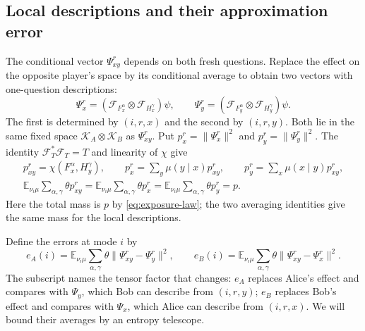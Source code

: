 \subsection{Local descriptions and their approximation error}

The conditional vector $\Psi_{xy}^r$ depends on both fresh questions.
Replace the effect on the opposite player's space by its conditional
average to obtain two vectors with one-question descriptions:
\[
 \Psi_x^r=(\mathcal F_{F_x^\alpha}\otimes
                         \mathcal F_{H_x^\gamma})\psi,\qquad
 \Psi_y^r=(\mathcal F_{F_y^\alpha}\otimes
                         \mathcal F_{H_y^\gamma})\psi.
\]
The first is determined by $(i,r,x)$ and the second by $(i,r,y)$.
Both lie in the same fixed space $\mathcal K_A\otimes\mathcal K_B$
as $\Psi_{xy}^r$. Put $p_x^r=\|\Psi_x^r\|^2$ and
$p_y^r=\|\Psi_y^r\|^2$. The identity
$\mathcal F_T^*\mathcal F_T=T$ and linearity of $\chi$ give
\begin{equation}\label{eq:exposure-norms}
 \begin{gathered}
 p_{xy}^r=\chi(F_x^\alpha,H_y^\gamma),\qquad
 p_x^r=\sum_y\mu(y\mid x)p_{xy}^r,\qquad
 p_y^r=\sum_x\mu(x\mid y)p_{xy}^r,\\
 \mathbb E_{\nu_i\mu}\sum_{\alpha,\gamma}\theta p_{xy}^r
 =\mathbb E_{\nu_i\mu}\sum_{\alpha,\gamma}\theta p_x^r
 =\mathbb E_{\nu_i\mu}\sum_{\alpha,\gamma}\theta p_y^r=p.
 \end{gathered}
\end{equation}
Here the total mass is $p$ by \eqref{eq:exposure-law}; the two averaging
identities give the same mass for the local descriptions.

Define the errors at mode $i$ by
\begin{equation}\label{eq:mode-error-definitions}
 e_A(i)=\mathbb E_{\nu_i\mu}\sum_{\alpha,\gamma}\theta
          \|\Psi_{xy}^r-\Psi_y^r\|^2,\qquad
 e_B(i)=\mathbb E_{\nu_i\mu}\sum_{\alpha,\gamma}\theta
          \|\Psi_{xy}^r-\Psi_x^r\|^2.
\end{equation}
The subscript names the tensor factor that changes: $e_A$ replaces
Alice's effect and compares with $\Psi_y$, which Bob can describe from
$(i,r,y)$; $e_B$ replaces Bob's effect and compares with $\Psi_x$, which
Alice can describe from $(i,r,x)$. We will bound their averages by an
entropy telescope.

